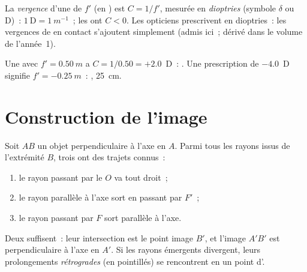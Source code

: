 \begin{definition}[Vergence]\label{def:g11:lenses-and-eye:vergence}
La \emph{vergence} d'une  de
 $f'$ (en ) est $C = 1/f'$,
mesurée en \emph{dioptries} (symbole $\delta$ ou D)~:
$1~\text{D} = \qty{1}{m^{-1}}$~; les  ont $C < 0$. Les opticiens prescrivent en
dioptries~: les vergences de  en contact
s'ajoutent simplement (admis ici~; dérivé dans le volume de l'année~1).
\end{definition}

\begin{example}\label{ex:g11:lenses-and-eye:vergence}
Une  avec $f' = \qty{0.50}{m}$ a
$C = 1/0.50 = +2.0$~D~: . Une prescription
de $-4.0$~D signifie $f' = \qty{-0.25}{m}$~:
, 
\qty{25}{cm}.
\end{example}

\section{Construction de l'image}

\begin{method}\label{met:g11:lenses-and-eye:rays}
Soit $AB$ un objet perpendiculaire à l'axe en $A$. Parmi tous les
rayons issus de l'extrémité $B$, trois ont des trajets connus~:
\begin{enumerate}
  \item le rayon passant par le  $O$ va tout
        droit~;
  \item le rayon parallèle à l'axe sort en passant par $F'$~;
  \item le rayon passant par $F$ sort parallèle à l'axe.
\end{enumerate}
Deux suffisent~: leur intersection est le point image $B'$, et l'image
$A'B'$ est perpendiculaire à l'axe en $A'$. Si les rayons émergents
divergent, leurs prolongements \emph{rétrogrades} (en pointillés) se
rencontrent en un point d'.
\end{method}

